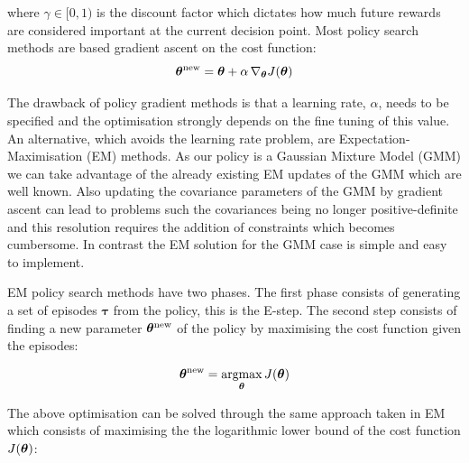 \begin{appendices}
where $\gamma \in [0,1)$ is the discount factor which dictates how much future rewards are considered important 
at the current decision point.
Most policy search methods are based gradient ascent on the cost function:
\begin{equation}
   \boldsymbol{\theta}^{\mathrm{new}} =  \boldsymbol{\theta} + \alpha\,\nabla_{\boldsymbol{\theta}}J(\boldsymbol{\theta})
\end{equation}

The drawback of policy gradient methods is that a learning rate, $\alpha$, needs to be specified and the optimisation strongly depends 
on the fine tuning of this value. An alternative, which avoids
the learning rate problem, are Expectation-Maximisation (EM) methods. As our policy is a Gaussian Mixture Model (GMM) we can take advantage of 
the already existing EM updates of the GMM which are well known. Also updating the covariance parameters of the GMM by gradient ascent can lead 
to problems such the covariances being no longer positive-definite and this resolution requires the addition of constraints which becomes 
cumbersome. In contrast the EM solution for the GMM case is simple and easy to implement.

EM policy search methods have two phases. The first phase consists of generating a set of episodes $\boldsymbol{\tau}$ from 
the policy, this is the E-step. The second step consists of finding a new parameter $\boldsymbol{\theta}^{\mathrm{new}}$ of the policy 
by maximising the cost function given the episodes:

\begin{equation}
  \Param^{\mathrm{new}} = \argmax\limits_{\Param} J(\Param) \label{eq:ch4:argmax}
\end{equation}

The above optimisation can be solved through the same approach taken in EM which consists of 
maximising the the logarithmic lower bound of the cost function $J(\boldsymbol{\theta})$: 





\end{appendices}
